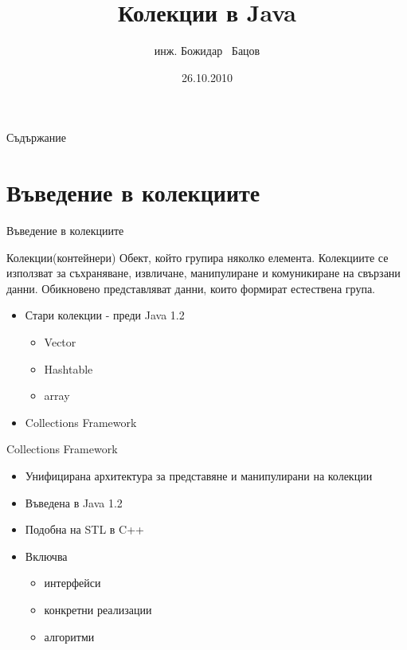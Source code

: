 \documentclass{beamer}
\title{Колекции в Java}
\author{инж. Божидар ~Бацов}
\institute{Drow Ltd.}
\date{26.10.2010}
\begin{document}
\begin{frame}
  \titlepage
\end{frame}

\begin{frame}{Съдържание}
  \tableofcontents
\end{frame}




\section{Въведение в колекциите}

\begin{frame}{Въведение в колекциите}
  \begin{block}{Колекции(контейнери)}
    Обект, който групира няколко елемента. Колекциите се използват за
    съхраняване, извличане, манипулиране и комуникиране на свързани
    данни. Обикновено представляват данни, които формират естествена група.
  \end{block}
  \begin{itemize}
  \item
    Стари колекции - преди Java 1.2
    \begin{itemize}
      \item Vector
      \item Hashtable
      \item array
    \end{itemize}
  \item Collections Framework
  \end{itemize}
\end{frame}

\begin{frame}{Collections Framework}
  \transdissolve
  \begin{itemize}
  \item  Унифицирана архитектура за представяне и манипулирани на
    колекции    
   \item Въведена в Java 1.2
  \item Подобна на STL в C++
  \item Включва
    \begin{itemize}
    \item интерфейси
    \item конкретни реализации
    \item алгоритми
    \end{itemize}
  \end{itemize}
\end{frame}
\end{document}
